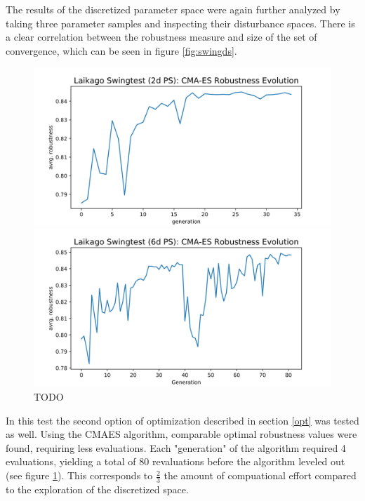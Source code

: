     The results of the discretized parameter space were again further analyzed by taking three parameter samples and inspecting their disturbance spaces. There is a clear correlation between the robustness measure and size of the set of convergence, which can be seen in figure \ref{fig:swingds}. 
    \begin{figure}[h]
        \centering
        \begin{minipage}{0.5\textwidth}
            \centering
            \includegraphics[width=\textwidth]{figures/swingtest_2dPS_cmaes.png} %
        \end{minipage}\hfill
        \begin{minipage}{0.5\textwidth}
            \centering
            \includegraphics[width=\textwidth]{figures/swingtest_6d_cmaes.png} %
        \end{minipage}
    \caption{TODO}
    \label{fig:cmaes}
    \end{figure}    
    In this test the second option of optimization described in section \ref{opt} was tested as well. Using the CMAES algorithm, comparable optimal robustness values were found, requiring less evaluations. Each "generation" of the algorithm required 4 evaluations, yielding a total of 80 revaluations before the algorithm leveled out (see figure \ref{fig:cmaes}). This corresponds to $\frac{2}{3}$ the amount of compuational effort compared to the exploration of the discretized space. 
